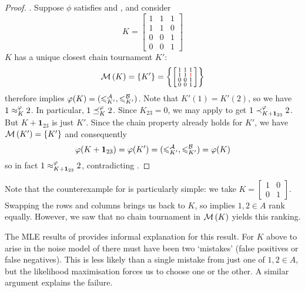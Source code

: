 \begin{proof}
    \posresp{}. Suppose $\phi$ satisfies \chainmin{} and
    \posresp{}, and consider
    \[
        K = \left[\begin{smallmatrix}
            1 & 1 & 1 \\
            1 & 1 & 0 \\
            0 & 0 & 1 \\
            0 & 0 & 1
        \end{smallmatrix}\right]
    \]
    $K$ has a unique closest chain tournament $K'$:
    \[
        \operatorname{\mathcal{M}}\left({K}\right) = \{K'\} = \left\{
            \left[\begin{smallmatrix}
            1 & 1 & 1 \\
            1 & 1 & \color{red}{1} \\
            0 & 0 & 1 \\
            0 & 0 & 1
        \end{smallmatrix}\right]
        \right\}
    \]
    \chainmin{} therefore implies $\varphi(K) = ({\leqslant^{\mathcal{A}}_{K'}},
    {\leqslant^{\mathcal{B}}_{K'}})$.  Note that $K'(1) = K'(2)$, so we have $1 \approx_K^\varphi 2$.
    In particular, $1 \preceq_K^\varphi 2$. Since $K_{23} = 0$, we may apply
    \posresp{} to get $1 \prec_{K + \bm{1}_{23}}^\varphi 2$.  But $K +
    \bm{1}_{23}$ is just $K'$. Since the chain property already holds for
    $K'$, we have $\operatorname{\mathcal{M}}\left({K'}\right) = \{K'\}$ and consequently
    \[
        \varphi(K + \bm{1}_{23})
        = \varphi(K')
        = ({\leqslant^{\mathcal{A}}_{K'}}, {\leqslant^{\mathcal{B}}_{K'}})
        = \varphi(K)
    \]
    so in fact $1 \approx_{K + \bm{1}_{23}}^\varphi 2$, contradicting
    \posresp{}.
\end{proof}

Note that the counterexample for \anon{} is particularly simple: we
take $K = \left[\begin{smallmatrix} 1&0\\0&1 \end{smallmatrix}\right]$.
    Swapping the rows and columns brings us back to $K$, so \anon{} implies
$1, 2 \in A$ rank equally. However, we saw that no chain tournament in
$\operatorname{\mathcal{M}}\left({K}\right)$ yields this ranking.

The MLE results of  provides informal
explanation for this result. For $K$ above to arise in the noise model of
 there must have been two `mistakes' (false positives or
false negatives). This is less likely than a single mistake from just one of
$1,2 \in A$, but the likelihood maximisation forces us to choose one or the
other. A similar argument explains the \posresp{} failure.

